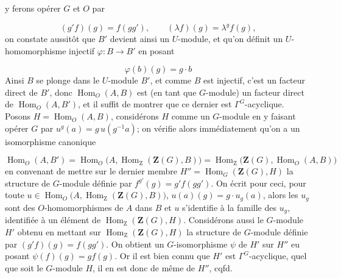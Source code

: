 \clearpage
{}

\noindent y ferons opérer $G$ et $O$ par

\[
(g'f)(g)=f(gg'),
\qquad
(\lambda f)(g)=\lambda^g f(g),
\]
 on constate aussitôt que $B'$ devient ainsi un $U$-module, et qu'on
définit un $U$-homomorphisme injectif $\varphi:B\to B'$ en posant

\[
\varphi(b)(g)=g\mathbin{\cdot}b
\]
Ainsi $B$ se plonge dans le $U$-module $B'$, et comme $B$ est injectif, c'est
un facteur direct de $B'$, donc $\operatorname{Hom}_O(A,B)$ est (en tant que
$G$-module) un facteur direct de $\operatorname{Hom}_O(A,B')$, et il suffit de
montrer que ce dernier est $\Gamma^G$-acyclique.
Posons $H=\operatorname{Hom}_O(A,B)$, considérons $H$ comme un $G$-module en y
faisant opérer $G$ par
$u^g(a)=g\,u(g^{-1}a)$;
on vérifie alors immédiatement qu'on a un isomorphisme canonique

\[
\operatorname{Hom}_O(A,B')
=\operatorname{Hom}_O
  \bigl(A,\operatorname{Hom}_{\mathrm Z}(\mathbf Z(G),B)\bigr)
=\operatorname{Hom}_{\mathrm Z}
  \bigl(\mathbf Z(G),\operatorname{Hom}_O(A,B)\bigr)
\]
 en convenant de mettre sur le dernier membre
$H''=\operatorname{Hom}_G(\mathbf Z(G),H)$ la structure de $G$-module définie
par
$f^{g'}(g)=g'f(gg')$.
On écrit pour ceci, pour toute
$u\in\operatorname{Hom}_O
\bigl(A,\operatorname{Hom}_{\mathrm Z}(\mathbf Z(G),B)\bigr)$,
$u(a)(g)=g\mathbin{\cdot}u_g(a)$, alors les $u_g$ sont des
$O$-homomorphismes de $A$ dans $B$ et $u$ s'identifie à la famille des $u_g$,
identifiée à un élément de $\operatorname{Hom}_{\mathrm Z}(\mathbf Z(G),H)$.
Considérons aussi le $G$-module $H'$ obtenu en mettant sur
$\operatorname{Hom}_{\mathrm Z}(\mathbf Z(G),H)$ la structure de $G$-module
définie par
$(g'f)(g)=f(gg')$.
On obtient un $G$-isomorphisme $\psi$ de $H'$ sur $H''$ eu posant
$\psi(f)(g)=g f(g)$.
Or il est bien connu que $H'$ est $\Gamma^G$-acyclique, quel que soit le
$G$-module $H$, il en est donc de même de $H''$, cqfd.

